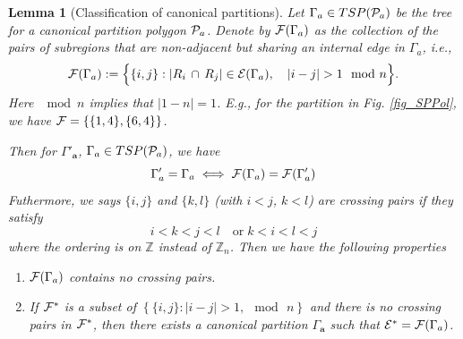 \documentclass[10pt,reqno]{article}
\theoremstyle{plain} %
\newtheorem{lemma}[theorem]{Lemma}
\theoremstyle{remark}
\numberwithin{equation}{section}
\begin{document}
\begin{lemma}[Classification of canonical partitions]\label{lem_CSP}
Let $\Gamma_\textbf{a}\in TSP({\cal P}_\textbf{a})$ be the  tree for a canonical partition   polygon ${\cal P}_{a}$. 
Denote by ${\cal F}(\Gamma_{\textbf{a}})$    as the collection of the pairs of subregions that are non-adjacent but sharing an internal edge in $\Gamma_a$, i.e., 
\begin{equation}\label{set_csp}
{\cal F}(\Gamma_{\textbf{a}}):=
\Big\{\{i,j\}: |R_i\,\cap\,R_j|\in {\cal E} (\Gamma_{\textbf{a}}),    \quad |i-j|>1 \mod n \Big\}.  
\end{equation}
Here  $\mod n$ implies that $|1- n |= 1$. 
 E.g., for the partition in Fig. \ref{fig_SPPol}, we have ${\cal F}=\{\{1,4\},\{6,4\} \}$. 

Then for  $\Gamma'_\textbf{a}$, $\Gamma_\textbf{a} \in TSP({\cal P}_\textbf{a})$, we have 
$$
\Gamma'_\textbf{a}=\Gamma _\textbf{a}\iff {\cal F}(\Gamma_{\textbf{a}})={\cal F}(\Gamma'_{\textbf{a}})
$$
Futhermore,  we says $\{i,j\}$ and  $\{k,l\}$ (with $i<j$, $k<l$) are crossing pairs if they satisfy 
 $$
 i<k<j<l \quad \text{or} \;  k<i<l<j
 $$
 where the ordering is on $\mathbb Z$ instead of $\mathbb Z_n$. 
 Then we have the following properties 
 \begin{enumerate}
     \item  ${\cal F}(\Gamma_{\textbf{a}})$ contains  {\textit no} crossing pairs.
     \item If ${\cal F}^*$ is a subset of $\left\{\{i, j\}:   | i-j|>1, \mod  \, n\right\}$ and there is {\textit no} crossing pairs in ${\cal F}^*$, then there exists a 
     canonical partition $\Gamma_{\textbf{a}}$ such that  ${\cal E}^*={\cal F}(\Gamma_{\textbf{a}})$.
 \end{enumerate}
\end{lemma}
\end{document}
